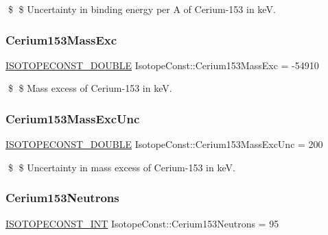 \$ \$ Uncertainty in binding energy per A of Cerium-\/153 in keV. \mbox{\label{group___isotope_const-_cerium-_ce153_gad8294eaf86fdf21070e56a7502289d37}} 
\subsubsection{\texorpdfstring{Cerium153\+Mass\+Exc}{Cerium153MassExc}}
{\footnotesize\ttfamily \mbox{\hyperlink{group___isotope_const-_macros_ga8f45a7272ce02c0b4c65c44636ed719a}{I\+S\+O\+T\+O\+P\+E\+C\+O\+N\+S\+T\+\_\+\+D\+O\+U\+B\+LE}} Isotope\+Const\+::\+Cerium153\+Mass\+Exc = -\/54910}

\$ \$ Mass excess of Cerium-\/153 in keV. \mbox{\label{group___isotope_const-_cerium-_ce153_ga67d59a4cd0d0a12ab5877431717246b1}} 
\subsubsection{\texorpdfstring{Cerium153\+Mass\+Exc\+Unc}{Cerium153MassExcUnc}}
{\footnotesize\ttfamily \mbox{\hyperlink{group___isotope_const-_macros_ga8f45a7272ce02c0b4c65c44636ed719a}{I\+S\+O\+T\+O\+P\+E\+C\+O\+N\+S\+T\+\_\+\+D\+O\+U\+B\+LE}} Isotope\+Const\+::\+Cerium153\+Mass\+Exc\+Unc = 200}

\$ \$ Uncertainty in mass excess of Cerium-\/153 in keV. \mbox{\label{group___isotope_const-_cerium-_ce153_gaf0affbd852455327e5513d206fc15feb}} 
\subsubsection{\texorpdfstring{Cerium153\+Neutrons}{Cerium153Neutrons}}
{\footnotesize\ttfamily \mbox{\hyperlink{group___isotope_const-_macros_ga5f18360b3e99483a35c32d789e62621c}{I\+S\+O\+T\+O\+P\+E\+C\+O\+N\+S\+T\+\_\+\+I\+NT}} Isotope\+Const\+::\+Cerium153\+Neutrons = 95}

